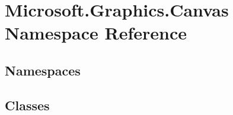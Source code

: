 \hypertarget{namespace_microsoft_1_1_graphics_1_1_canvas}{}\section{Microsoft.\+Graphics.\+Canvas Namespace Reference}
\label{namespace_microsoft_1_1_graphics_1_1_canvas}
\subsection*{Namespaces}
\begin{DoxyCompactItemize}
\end{DoxyCompactItemize}
\subsection*{Classes}
